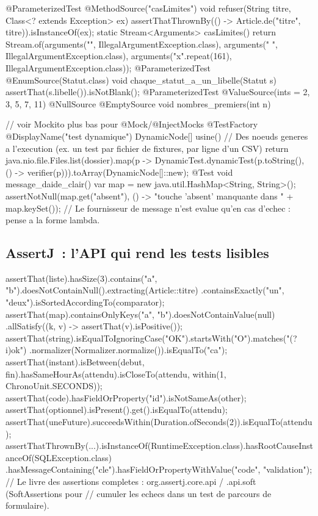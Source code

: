 \begin{codejava}
{    @ParameterizedTest @MethodSource("casLimites")
    void refuser(String titre, Class<? extends Exception> ex) {
        assertThatThrownBy(() -> Article.de("titre", titre)).isInstanceOf(ex);
    }
    static Stream<Arguments> casLimites() {
        return Stream.of(arguments("", IllegalArgumentException.class),
                          arguments("  ", IllegalArgumentException.class),
                          arguments("x".repeat(161), IllegalArgumentException.class));
    }
    @ParameterizedTest @EnumSource(Statut.class)
    void chaque_statut_a_un_libelle(Statut s) { assertThat(s.libelle()).isNotBlank(); }
    @ParameterizedTest @ValueSource(ints = {2, 3, 5, 7, 11}) @NullSource @EmptySource
    void nombres_premiers(int n) { }

    // voir Mockito plus bas pour @Mock/@InjectMocks
    @TestFactory @DisplayName("test dynamique") DynamicNode[] usine() {
        // Des noeuds generes a l'execution (ex. un test par fichier de fixtures, par ligne d'un CSV)
        return java.nio.file.Files.list(dossier).map(p ->
                DynamicTest.dynamicTest(p.toString(), () -> verifier(p))).toArray(DynamicNode[]::new);
    }
    @Test void message_daide_clair() {
        var map = new java.util.HashMap<String, String>();
        assertNotNull(map.get("absent"), () -> "touche 'absent' manquante dans " + map.keySet());
        // Le fournisseur de message n'est evalue qu'en cas d'echec : pense a la forme lambda.
    }
}
\end{codejava}

\subsection{AssertJ~: l'API qui rend les tests lisibles}

\begin{codejava}
assertThat(liste).hasSize(3).contains("a", "b").doesNotContainNull().extracting(Article::titre)
        .containsExactly("un", "deux").isSortedAccordingTo(comparator);
assertThat(map).containsOnlyKeys("a", "b").doesNotContainValue(null)
        .allSatisfy((k, v) -> assertThat(v).isPositive());
assertThat(string).isEqualToIgnoringCase("OK").startsWith("O").matches("(?i)ok")
        .normalizer(Normalizer.normalize()).isEqualTo("ca");
assertThat(instant).isBetween(debut, fin).hasSameHourAs(attendu).isCloseTo(attendu, within(1, ChronoUnit.SECONDS));
assertThat(code).hasFieldOrProperty("id").isNotSameAs(other);
assertThat(optionnel).isPresent().get().isEqualTo(attendu);
assertThat(uneFuture).succeedsWithin(Duration.ofSeconds(2)).isEqualTo(attendu);
assertThatThrownBy(...).isInstanceOf(RuntimeException.class).hasRootCauseInstanceOf(SQLException.class)
        .hasMessageContaining("cle").hasFieldOrPropertyWithValue("code", "validation");
// Le livre des assertions completes : org.assertj.core.api / .api.soft (SoftAssertions pour
// cumuler les echecs dans un test de parcours de formulaire).
\end{codejava}


